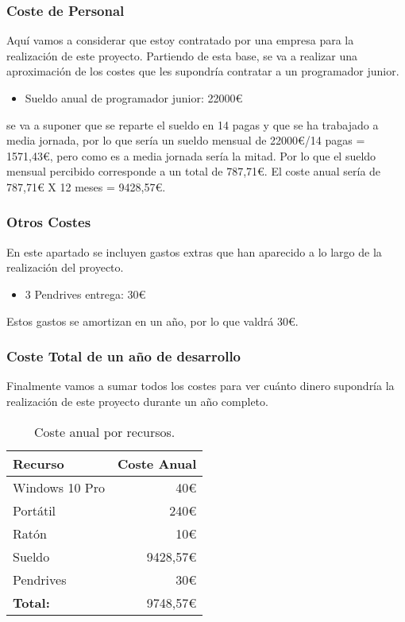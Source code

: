 \subsubsection{Coste de Personal}
Aquí vamos a considerar que estoy contratado por una empresa para la realización de este proyecto. Partiendo de esta base, se va a realizar una aproximación de los costes que les supondría contratar a un programador junior.
\begin{itemize}
    \item Sueldo anual de programador junior: 22000€
\end{itemize}
se va a suponer que se reparte el sueldo en 14 pagas y que se ha trabajado a media jornada, por lo que sería un sueldo mensual de 22000€/14 pagas = 1571,43€, pero como es a media jornada sería la mitad. Por lo que el sueldo mensual percibido corresponde a un total de 787,71€. El coste anual sería de 787,71€ X 12 meses = 9428,57€.

\subsubsection{Otros Costes}
En este apartado se incluyen gastos extras que han aparecido a lo largo de la realización del proyecto.
\begin{itemize}
    \item 3 Pendrives entrega: 30€
\end{itemize}
Estos gastos se amortizan en un año, por lo que valdrá 30€.

\subsubsection{Coste Total de un año de desarrollo}
Finalmente vamos a sumar todos los costes para ver cuánto dinero supondría la realización de este proyecto durante un año completo.

\begin{table}[h!]
	\centering
	\begin{tabular}{| l | r |}
		\toprule
		\textbf{Recurso} & \textbf{Coste Anual} \\ \midrule
		Windows 10 Pro & 40€\\
		Portátil &  240€ \\
            Ratón &  10€ \\
		Sueldo &  9428,57€\\
            Pendrives  &  30€\\
		\midrule
		\textbf{Total:} &  9748,57€ \\
		\bottomrule
	\end{tabular}
	\caption{Coste anual por recursos.}
	\label{CostResources}
\end{table}


